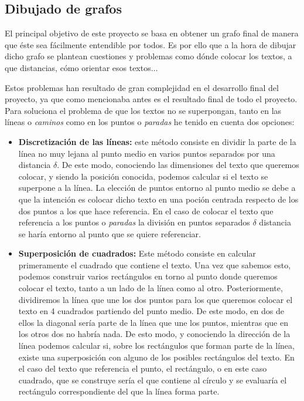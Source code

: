 \subsection{Dibujado de grafos}
El principal objetivo de este proyecto se basa en obtener un grafo final de manera que éste sea fácilmente entendible por todos. Es por ello que a la hora de dibujar dicho grafo se plantean cuestiones y problemas como dónde colocar los textos, a que distancias, cómo orientar esos textos$\dots$

Estos problemas han resultado de gran complejidad en el desarrollo final del proyecto, ya que como mencionaba antes es el resultado final de todo el proyecto. Para soluciona el problema de que los textos no se superpongan, tanto en las líneas o \textit{caminos} como en los puntos o \textit{paradas} he tenido en cuenta dos opciones:
\begin{itemize}
	\item \textbf{Discretización de las líneas:} este método consiste en dividir la parte de la línea no muy lejana al punto medio en varios puntos separados por una distancia $\delta$. De este modo, conociendo las dimensiones del texto que queremos colocar, y siendo la posición conocida, podemos calcular si el texto se superpone a la línea. La elección de puntos entorno al punto medio se debe a que la intención es colocar dicho texto en una poción centrada respecto de los dos puntos a los que hace referencia. En el caso de colocar el texto que referencia a los puntos o \textit{paradas} la división en puntos separados $\delta$ distancia se haría entorno al punto que se quiere referenciar.
	\item \textbf{Superposición de cuadrados:} Este método consiste en calcular primeramente el cuadrado que contiene el texto. Una vez que sabemos esto, podemos construir varios rectángulos en torno al punto donde queremos colocar el texto, tanto a un lado de la línea como al otro. Posteriormente, dividiremos la línea que une los dos puntos para los que queremos colocar el texto en 4 cuadrados partiendo del punto medio. De este modo, en dos de ellos la diagonal sería parte de la línea que une los puntos, mientras que en los otros dos no habría nada. De esto modo, y conociendo la dirección de la línea podemos calcular si, sobre los rectángulos que forman parte de la línea, existe una superposición con alguno de los posibles rectángulos del texto. En el caso del texto que referencia el punto, el rectángulo, o en este caso cuadrado, que se construye sería el que contiene al círculo y se evaluaría el rectángulo correspondiente del que la línea forma parte.
\end{itemize}

